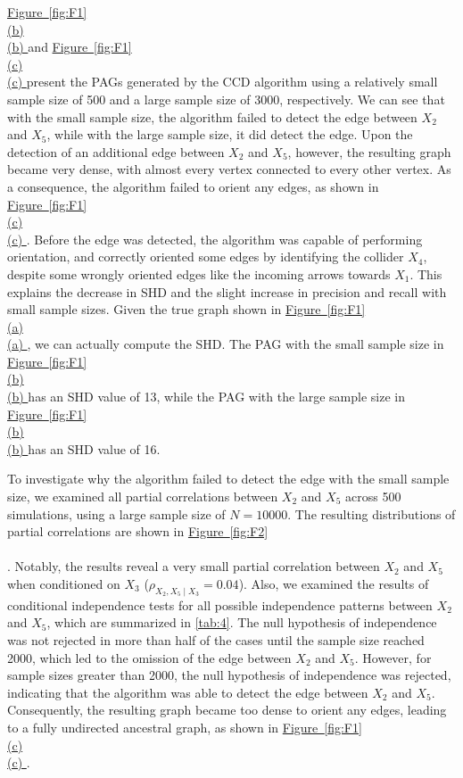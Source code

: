 \documentclass[twoside, 11pt]{article}
\newcommand*{\figref}[2][]{%
  \hyperref[{fig:#2}]{%
    Figure~\ref*{fig:#2}%
    \ifx\\#1\\%
    \else
      #1%
    \fi
  }%
}
\begin{document}
\begin{appendices}
\figref[(b)]{F1} and \figref[(c)]{F1} present the PAGs generated by the CCD algorithm using a relatively small sample size of 500 and a large sample size of 3000, respectively. 
We can see that with the small sample size, the algorithm failed to detect the edge between $X_2$ and $X_5$, while with the large sample size, it did detect the edge. 
Upon the detection of an additional edge between $X_2$ and $X_5$, however, the resulting graph became very dense, with almost every vertex connected to every other vertex. As a consequence, the algorithm failed to orient any edges, as shown in \figref[(c)]{F1}. 
Before the edge was detected, the algorithm was capable of performing orientation, and correctly oriented some edges by identifying the collider $X_4$, despite some wrongly oriented edges like the incoming arrows towards $X_1$. This explains the decrease in SHD and the slight increase in precision and recall with small sample sizes. Given the true graph shown in \figref[(a)]{F1}, we can actually compute the SHD. The PAG with the small sample size in \figref[(b)]{F1} has an SHD value of 13, while the PAG with the large sample size in \figref[(b)]{F1} has an SHD value of 16.

To investigate why the algorithm failed to detect the edge with the small sample size, we examined all partial correlations between $X_2$ and $X_5$ across 500 simulations, using a large sample size of $N=10000$. The resulting distributions of partial correlations are shown in \figref[]{F2}. Notably, the results reveal a very small partial correlation between $X_2$ and $X_5$ when conditioned on $X_3$ ($\rho_{X_2, X_5 \mid X_3} = 0.04$). Also, we examined the results of conditional independence tests for all possible independence patterns between $X_2$ and $X_5$, which are summarized in \autoref{tab:4}. 
The null hypothesis of independence was not rejected in more than half of the cases until the sample size reached 2000, which led to the omission of the edge between $X_2$ and $X_5$. However, for sample sizes greater than 2000, the null hypothesis of independence was rejected, indicating that the algorithm was able to detect the edge between $X_2$ and $X_5$. Consequently, the resulting graph became too dense to orient any edges, leading to a fully undirected ancestral graph, as shown in \figref[(c)]{F1}.


\end{appendices}
\end{document}
